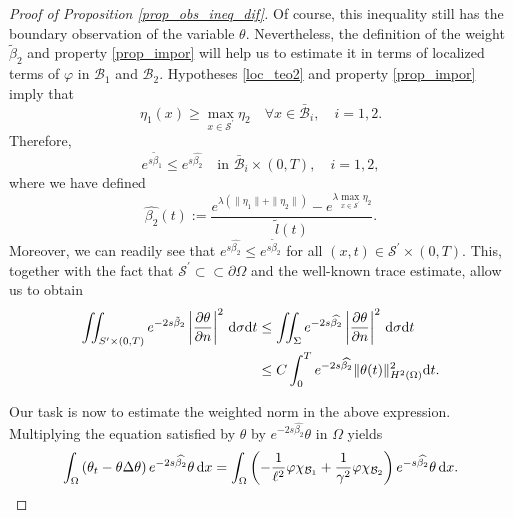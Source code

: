 \documentclass{dcds-bOF}
\theoremstyle{definition}
\newcommand\csin[1]{\chi_{#1}}
\def\dx{\,\textnormal{d}x}
\def\dt{\textnormal{d}t}
\def\d{\,\textnormal{d}}
\begin{document}
\begin{proof}[Proof of Proposition \ref{prop_obs_ineq_dif}]
 Of course, this inequality still has the boundary observation of the variable $\theta$. Nevertheless, the definition of the weight $\tilde\beta_2$ and property \eqref{prop_impor} will help us to estimate it in terms of localized terms of $\varphi$ in $\mathcal B_1$ and $\mathcal B_2$. Hypotheses \eqref{loc_teo2} and property \eqref{prop_impor} imply that
 \begin{equation*}
 \eta_1(x) \geq \max_{x\in \mathcal S^\prime}\eta_2 \quad \forall  x\in\bar{\mathcal B}_i, \quad i=1,2.
 \end{equation*}
 Therefore,
 \begin{equation}\label{rel_eta1_eta2}
 e^{s\tilde\beta_1}\leq e^{s\widehat{\beta_2}} \quad\text{in } \bar{\mathcal B}_i\times(0,T), \quad i=1,2,
 \end{equation}
 where we have defined
 \begin{equation*}
 \widehat{\beta_2}(t):=\frac{e^{\lambda(\|\eta_1\|+\|\eta_2\|)}-e^{{\lambda}\max_{x\in\mathcal S^\prime}\eta_2}}{\widetilde{l}(t)}.
 \end{equation*}
Moreover, we can readily see that $e^{s\widehat{\beta_2}}\leq e^{s\tilde\beta_2}$ for all $(x,t)\in \mathcal S^\prime\times(0,T)$. This, together with the fact that $\mathcal S^\prime\subset\subset\partial \Omega$ and the well-known trace estimate, allow us to obtain
%
\begin{align}\notag
\iint_{S^{\prime}\times(0,T)}e^{-2s\tilde\beta_2}\left|\frac{\partial \theta}{\partial n}\right|^2\d\sigma\dt &\leq \iint_{\Sigma}e^{-2s\widehat{\beta_2}}\left|\frac{\partial \theta}{\partial n}\right|^2\d\sigma\dt \\ \label{est_local_theta}
&\leq C\int_{0}^{T}e^{-2s\widehat{\beta_2}}\|\theta(t)\|_{H^2(\Omega)}^2\dt.
\end{align}

Our task is now to estimate the weighted norm in the above expression. Multiplying the equation satisfied by $\theta$ by $e^{-2s\widehat{\beta_2}}\theta$ in $\Omega$ yields
%
\begin{equation*}\int_{\Omega}\left(\theta_t-\theta \Delta \theta\right) e^{-2s\widehat{\beta_2}}\theta \dx=\int_{\Omega}\left(-\frac{1}{\ell^2}\varphi\csin{\mathcal B_1}+\frac{1}{\gamma^2}\varphi \csin{\mathcal B_2}\right)e^{-s\widehat{\beta_2}}\theta\dx.\end{equation*}


\end{proof}
\end{document}
